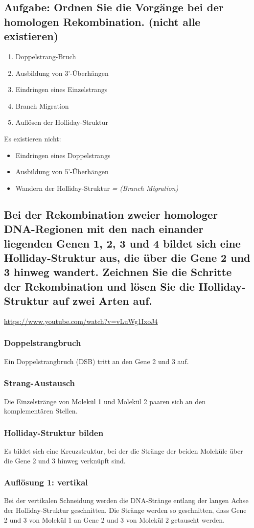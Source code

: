 \documentclass{article}
\begin{document}
\subsection*{Aufgabe: Ordnen Sie die Vorgänge bei der homologen Rekombination. (nicht alle existieren)}
\begin{enumerate}
    \item Doppelstrang-Bruch
    \item Ausbildung von 3'-Überhängen
    \item Eindringen eines Einzelstrangs
    \item Branch Migration
    \item Auflösen der Holliday-Struktur
\end{enumerate}
Es existieren nicht: 
\begin{itemize}
    \item  Eindringen eines Doppelstrangs
    \item Ausbildung von 5'-Überhängen
    \item Wandern der Holliday-Struktur \textit{= (Branch Migration)}
\end{itemize}

\subsection*{Bei der Rekombination zweier homologer DNA-Regionen mit den nach einander liegenden Genen 1, 2, 3 und 4 bildet sich eine Holliday-Struktur aus, die über die Gene 2 und 3 hinweg wandert. Zeichnen Sie die Schritte der Rekombination und lösen Sie die Holliday-Struktur auf zwei Arten auf.} 
\url{https://www.youtube.com/watch?v=vLuWg1IxoJ4}
\subsubsection*{Doppelstrangbruch}
Ein Doppelstrangbruch (DSB) tritt an den Gene 2 und 3 auf.
\subsubsection*{Strang-Austausch}
Die Einzelstränge von Molekül 1 und Molekül 2 paaren sich an den komplementären Stellen.
\subsubsection*{Holliday-Struktur bilden}
Es bildet sich eine Kreuzstruktur, bei der die Stränge der beiden Moleküle über die Gene 2 und 3 hinweg verknüpft sind.
\subsubsection*{Auflösung 1: vertikal}
Bei der vertikalen Schneidung werden die DNA-Stränge entlang der langen Achse der Holliday-Struktur geschnitten. \newline 
Die Stränge werden so geschnitten, dass Gene 2 und 3 von Molekül 1 an Gene 2 und 3 von Molekül 2 getauscht werden.
\end{document}
